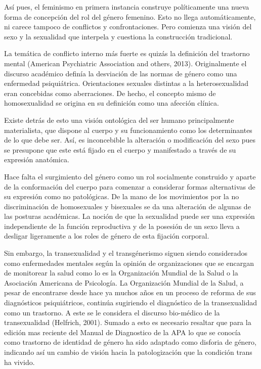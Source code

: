 Así pues, el feminismo en primera instancia construye políticamente una nueva
forma de concepción del rol del género femenino.
Esto no llega automáticamente, ni carece tampoco de conflictos y
confrontaciones.
Pero comienza una visión del sexo y la sexualidad que interpela y cuestiona la
construcción tradicional.

La temática de conflicto interno más fuerte es quizás la definición del
trastorno mental (American Psychiatric Association and others, 2013).
Originalmente el discurso académico definía la desviación de las normas de
género como una enfermedad psiquiátrica.
Orientaciones sexuales distintas a la heterosexualidad eran concebidas como
aberraciones.
De hecho, el concepto mismo de homosexualidad se origina en su definición como
una afección clínica.

Existe detrás de esto una visión ontológica del ser humano principalmente
materialista, que dispone al cuerpo y su funcionamiento como los determinantes
de lo que debe ser.
Así, es inconcebible la alteración o modificación del sexo pues se presupone que
este está fijado en el cuerpo y manifestado a través de su expresión anatómica.

Hace falta el surgimiento del género como un rol socialmente construido y aparte
de la conformación del cuerpo para comenzar a considerar formas alternativas de
su expresión como no patológicas.
De la mano de los movimientos por la no discriminación de homosexuales y
bisexuales se da una alteración de algunas de las posturas académicas.
La noción de que la sexualidad puede ser una expresión independiente de la
función reproductiva y de la posesión de un sexo lleva a desligar ligeramente a
los roles de género de esta fijación corporal.

Sin embargo, la transexualidad y el transgénerismo siguen siendo considerados
como enfermedades mentales según la opinión de organizaciones que se encargan de
monitorear la salud como lo es la Organización Mundial de la Salud o la
Asociación Americana de Psicología.
La Organización Mundial de la Salud, a pesar de encontrarse desde hace ya muchos
años en un proceso de reforma de sus diagnósticos psiquiátricos, continúa
sugiriendo el diagnóstico de la transexualidad como un trastorno.
A este se le considera el discurso bio-médico de la transexualidad (Helfrich,
2001).
Sumado a esto es necesario resaltar que para la edición mas reciente del Manual
de Diagnostico de la APA lo que se conocía como trastorno de identidad de género
ha sido adaptado como disforia de género, indicando así un cambio de visión
hacia la patologización que la condición trans ha vivido.

